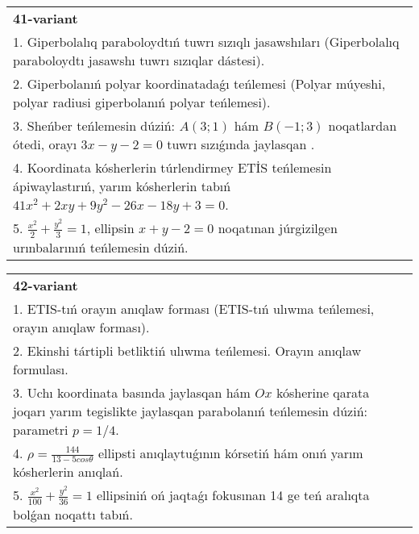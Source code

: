 \documentclass{article}
\begin{document}
\begin{tabular}{m{17cm}}
\textbf{41-variant}\\
1. Giperbolalıq paraboloydtıń tuwrı sızıqlı jasawshıları (Giperbolalıq paraboloydtı jasawshı tuwrı sızıqlar dástesi).\\

2. Giperbolanıń polyar koordinatadaǵı teńlemesi (Polyar múyeshi, polyar radiusi giperbolanıń polyar teńlemesi).\\

3. Sheńber teńlemesin dúziń: $A (3;1) $ hám $B (-1;3) $ noqatlardan ótedi, orayı $3 x-y-2=0$ tuwrı sızıǵında jaylasqan .\\

4. Koordinata kósherlerin túrlendirmey ETİS teńlemesin ápiwaylastırıń, yarım kósherlerin tabıń $41x^{2} + 2xy + 9y^{2} - 26x - 18y + 3 = 0$.  \\

5. $\frac{x^{2}}{2} + \frac{y^{2}}{3} = 1$, ellipsin $x + y - 2 = 0$ noqatınan júrgizilgen urınbalarınıń teńlemesin dúziń.  
\end{tabular}
\vspace{1cm}


\begin{tabular}{m{17cm}}
\textbf{42-variant}\\
1. ETIS-tıń orayın anıqlaw forması (ETIS-tıń ulıwma teńlemesi, orayın anıqlaw forması).\\

2. Ekinshi tártipli betliktiń ulıwma teńlemesi. Orayın anıqlaw formulası.\\

3. Uchı koordinata basında jaylasqan hám $Ox$ kósherine qarata joqarı yarım tegislikte jaylasqan parabolanıń teńlemesin dúziń: parametri $p=1/4$.\\

4. $\rho = \frac{144}{13 - 5cos\theta}$ ellipsti anıqlaytuǵının kórsetiń hám onıń yarım kósherlerin anıqlań.\\

5. $\frac{x^{2}}{100} + \frac{y^{2}}{36} = 1$ ellipsiniń oń jaqtaǵı fokusınan 14 ge teń aralıqta bolǵan noqattı tabıń.  
\end{tabular}
\vspace{1cm}
\end{document}
